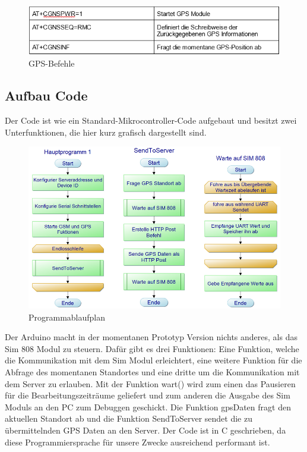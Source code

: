 \begin{figure} [H]
 \begin{center}
		\includegraphics[width=1\textwidth]{Bilder/Arduino_Befehlstabelle_2.png}
		\caption{GPS-Befehle}
		\label{GPS}
	\end{center}
\end{figure}

\subsection{Aufbau Code}
Der Code ist wie ein Standard-Mikrocontroller-Code aufgebaut und besitzt zwei Unterfunktionen, die hier kurz grafisch dargestellt sind.
\begin{figure} [H]
	\begin{center}
		\includegraphics[width=1\textwidth]{Bilder/Arduino_Codeaufbau.png}
		\caption{Programmablaufplan}
		\label{PAP}
	\end{center}
\end{figure}
Der Arduino macht in der momentanen Prototyp Version nichts anderes, als das Sim 808 Modul zu steuern. Dafür gibt es drei Funktionen:
Eine Funktion, welche die Kommunikation mit dem Sim Modul erleichtert, eine weitere Funktion für die Abfrage des momentanen Standortes und eine dritte um die Kommunikation mit dem Server zu erlauben. 
Mit der Funktion wart() wird zum einen das Pausieren für die Bearbeitungszeiträume geliefert und zum anderen die Ausgabe des Sim Moduls an den PC zum Debuggen geschickt. 
Die Funktion gpsDaten fragt den aktuellen Standort ab und die Funktion SendToServer sendet die zu übermittelnden GPS Daten an den Server.
Der Code ist in C geschrieben, da diese Programmiersprache für unsere Zwecke ausreichend performant ist.

